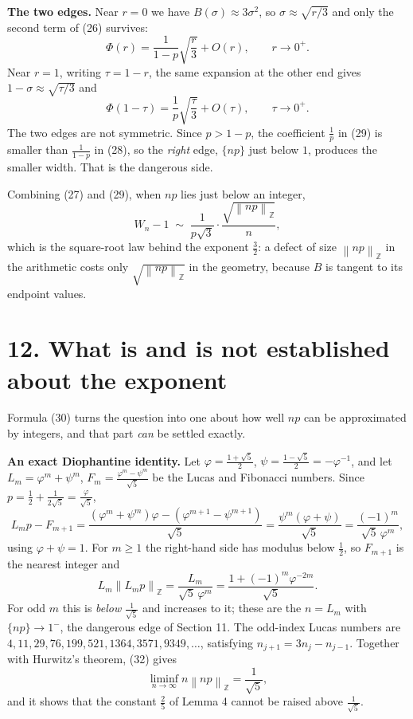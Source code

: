 \documentclass[12pt]{article}
\newcommand{\ZZ}{\mathbb Z}
\newcommand{\normZ}[1]{\left\lVert #1\right\rVert_{\ZZ}}
\begin{document}
\textbf{The two edges.} Near \(r=0\) we have \(B(\sigma)\approx3\sigma^2\),
so \(\sigma\approx\sqrt{r/3}\) and only the second term of (26) survives:
\[
\Phi(r)=\frac1{1-p}\sqrt{\frac r3}+O(r),
\qquad r\to0^{+}.
\tag{28}
\]
Near \(r=1\), writing \(\tau=1-r\), the same expansion at the other end
gives \(1-\sigma\approx\sqrt{\tau/3}\) and
\[
\Phi(1-\tau)=\frac1p\sqrt{\frac\tau3}+O(\tau),
\qquad \tau\to0^{+}.
\tag{29}
\]
The two edges are not symmetric. Since \(p>1-p\), the coefficient
\(\frac1p\) in (29) is smaller than \(\frac1{1-p}\) in (28), so the
\emph{right} edge, \(\{np\}\) just below \(1\), produces the smaller
width. That is the dangerous side.

Combining (27) and (29), when \(np\) lies just below an integer,
\[
W_n-1
\;\sim\;
\frac{1}{p\sqrt3}\cdot\frac{\sqrt{\normZ{np}}}{n},
\tag{30}
\]
which is the square-root law behind the exponent \(\frac32\): a defect of
size \(\normZ{np}\) in the arithmetic costs only \(\sqrt{\normZ{np}}\) in
the geometry, because \(B\) is tangent to its endpoint values.

\section*{12. What is and is not established about the exponent}

Formula (30) turns the question into one about how well \(np\) can be
approximated by integers, and that part \emph{can} be settled exactly.

\textbf{An exact Diophantine identity.} Let \(\varphi=\frac{1+\sqrt5}2\),
\(\psi=\frac{1-\sqrt5}2=-\varphi^{-1}\), and let \(L_m=\varphi^m+\psi^m\),
\(F_m=\frac{\varphi^m-\psi^m}{\sqrt5}\) be the Lucas and Fibonacci
numbers. Since \(p=\frac12+\frac1{2\sqrt5}=\frac{\varphi}{\sqrt5}\),
\[
L_mp-F_{m+1}
=\frac{(\varphi^m+\psi^m)\varphi-(\varphi^{m+1}-\psi^{m+1})}{\sqrt5}
=\frac{\psi^m(\varphi+\psi)}{\sqrt5}
=\frac{(-1)^m}{\sqrt5\,\varphi^{m}},
\tag{31}
\]
using \(\varphi+\psi=1\). For \(m\ge1\) the right-hand side has modulus
below \(\frac12\), so \(F_{m+1}\) is the nearest integer and
\[
L_m\normZ{L_mp}=\frac{L_m}{\sqrt5\,\varphi^m}
=\frac{1+(-1)^m\varphi^{-2m}}{\sqrt5}.
\tag{32}
\]
For odd \(m\) this is \emph{below} \(\frac1{\sqrt5}\) and increases to it;
these are the \(n=L_m\) with \(\{np\}\to1^-\), the dangerous edge of
Section 11. The odd-index Lucas numbers are
\(4,11,29,76,199,521,1364,3571,9349,\dots\), satisfying
\(n_{j+1}=3n_j-n_{j-1}\). Together with Hurwitz's theorem, (32) gives
\[
\liminf_{n\to\infty}n\normZ{np}=\frac1{\sqrt5},
\tag{33}
\]
and it shows that the constant \(\frac25\) of Lemma 4 cannot be raised
above \(\frac1{\sqrt5}\).
\end{document}
